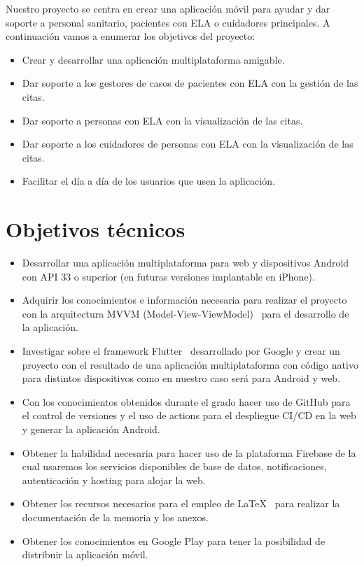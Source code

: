 

Nuestro proyecto se centra en crear una aplicación móvil para ayudar y dar soporte a personal sanitario, pacientes con ELA o cuidadores principales. A continuación vamos a enumerar los objetivos del proyecto:
\begin{itemize}
\item Crear y desarrollar una aplicación multiplataforma amigable.
\item Dar soporte a los gestores de casos de pacientes con ELA con la gestión de las citas.
\item Dar soporte a personas con ELA con la visualización de las citas.
\item Dar soporte a los cuidadores de personas con ELA con la visualización de las citas.
\item Facilitar el día a día de los usuarios que usen la aplicación.
\end{itemize}

\section{Objetivos técnicos} 
\begin{itemize}
\item Desarrollar una aplicación multiplataforma para web y dispositivos Android con API 33 o superior (en futuras versiones implantable en iPhone).
\item Adquirir los conocimientos e información necesaria para realizar el proyecto con la arquitectura MVVM (Model-View-ViewModel)~\cite{mvvm} para el desarrollo de la aplicación.
\item Investigar sobre el framework Flutter~\cite{flutter} desarrollado por Google  y crear un proyecto con el resultado de una aplicación multiplataforma con código nativo para distintos dispositivos como en nuestro caso será para Android y web.
\item Con los conocimientos obtenidos durante el grado hacer uso de  GitHub para el control de versiones y el uso de actions para el despliegue CI/CD en la web y generar la aplicación Android.
\item Obtener la habilidad necesaria para hacer uso de la plataforma Firebase de la cual usaremos los servicios disponibles de base de datos, notificaciones, autenticación y hosting para alojar la web.
\item Obtener los recursos necesarios para el empleo de LaTeX~\cite{texmaker} para realizar la documentación de la memoria y los anexos. 
\item Obtener los conocimientos en Google Play para tener la posibilidad de distribuir la aplicación móvil. 
\end{itemize}

